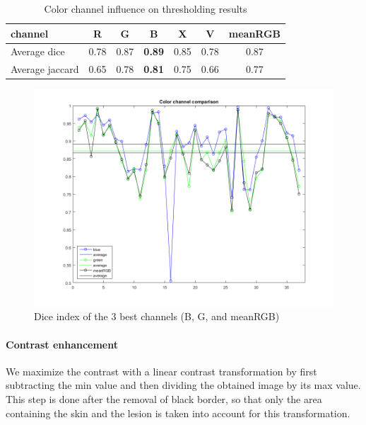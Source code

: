 \documentclass[a4paper,10pt]{article}
\begin{document}
\begin{table}
	\caption{Color channel influence on thresholding results}
	\centering
	\begin{tabular}{l| *{6}{c}}	
	 channel & R & G & \textbf{B} & X & V & meanRGB \\ 
	\hline
	 Average dice & 0.78 & 0.87 & \textbf{0.89} & 0.85 & 0.78 & 0.87 \\ 
	 Average jaccard & 0.65 & 0.78 & \textbf{0.81} & 0.75 & 0.66 & 0.77 
	\end{tabular}
	\label{tab:color-channel}
\end{table}

\begin{figure}	[h]
	\includegraphics[width=0.9\linewidth]{../results/color-channel-influence/base-evaluation/channel-compare.png} 
	\caption{Dice index of the 3 best channels (B, G, and meanRGB)}
	\label{fig:color-channel-otsu}
\end{figure} 

\paragraph{Contrast enhancement}
We maximize the contrast with a linear contrast transformation by first subtracting the min value and then dividing the obtained image by its max value. This step is done after the removal of black border, so that only the area containing the skin and the lesion is taken into account for this transformation.
\end{document}
